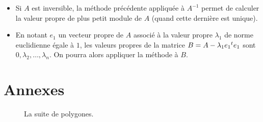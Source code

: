  \begin{remark}
    \begin{itemize}
      \item Si $A$ est inversible, la méthode précédente appliquée à $A^{-1}$ permet de calculer la valeur propre de plus petit module de $A$ (quand cette dernière est unique).
      \item En notant $e_1$ un vecteur propre de $A$ associé à la valeur propre $\lambda_1$ de norme euclidienne égale à $1$, les valeurs propres de la matrice $B = A - \lambda_1 e_1 \mathstrut ^t e_1$ sont $0, \lambda_2, \dots, \lambda_n$. On pourra alors appliquer la méthode à $B$.
    \end{itemize}
  \end{remark}

  \newpage
  \section*{Annexes}


  \begin{figure}[h]
    \begin{center}
    \end{center}
    \caption{La suite de polygones.}
  \end{figure}

